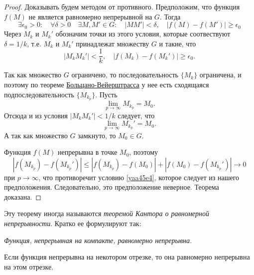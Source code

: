 \begin{proof}
Доказывать будем методом от противного. Предположим, что функция $f(M)$ не является равномерно непрерывной на $G$. Тогда
$$
\exists\epsilon_0>0:\quad\forall\delta>0\quad\exists M,M'\in G:\quad |MM'|<\delta, \quad |f(M)-f(M')|\ge \epsilon_0
$$
Через $M_k$ и $M_k'$ обозначим точки из этого условия, которые соотвествуют $\delta=1/k$, т.е. $M_k$ и $M_k'$ принадлежат множеству $G$ и такие, что 
\begin{equation}\label{yaa45e4}
|M_kM_k'|<\frac{1}{k},\quad|f(M_k)-f(M_k')|\ge \epsilon_0.
\end{equation}

Так как множество $G$ ограничено, то последовательность $\{M_k\}$ ограничена, и поэтому по теореме \hyperref[ch1.1thm3]{Больцано-Вейерштрасса} у нее есть сходящаяся подпоследовательность $\{M_{k_p}\}$. Пусть
$$
\lim\limits_{p\to\infty} M_{k_p} =M_0.
$$
Отсюда и из условия $|M_kM_k'|<1/k$ следует, что 
$$
\lim\limits_{p\to\infty} M_{k_p}' =M_0.
$$
А так как множество $G$ замкнуто, то $M_0 \in G$.

Функция $f(M)$ непрерывна в точке $M_0$, поэтому
$$
|f(M_{k_p})-f(M_{k_p}')|\le |f(M_{k_p})-f(M_0)|+|f(M_0)-f(M_{k_p}')|\to 0
$$
при $p\to\infty$, что противоречит условию \eqref{yaa45e4}, которое следует из нашего предположения. Следовательно, это предположение неверное. Теорема доказана.
\end{proof}

Эту теорему иногда называются \textit{теоремой Кантора о равномерной непрерывности}. Кратко ее формулируют так:

\textit{Функция, непрерывная на компакте, равномерно непрерывна.}
\begin{cons}
Если функция непрерывна на некотором отрезке, то она равномерно непрерывна на этом отрезке. 
\end{cons}


















